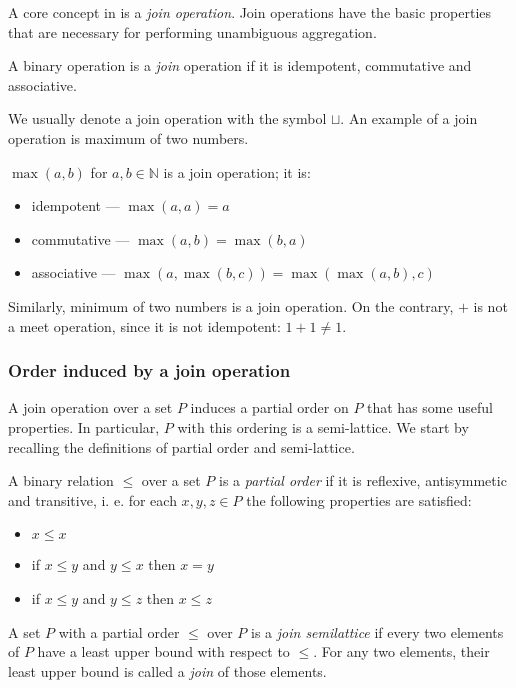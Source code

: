A core concept in \datalogra is a \emph{join operation}. Join operations have the basic properties that are necessary for performing unambiguous aggregation.

\begin{defn}
A binary operation is a \emph{join} operation if it is idempotent, commutative and associative. 
\end{defn}

We usually denote a join operation with the symbol $\sqcup$.
An example of a join operation is maximum of two numbers.

\begin{exmp}
$\max(a, b)$ for $a, b \in \mathbb{N}$ is a join operation; it is:
\begin{itemize}
\item idempotent --- $\max(a, a) = a$
\item commutative --- $\max(a, b) = \max(b, a)$
\item associative --- $\max(a, \max(b, c)) = \max(\max(a, b), c)$
\end{itemize}

Similarly, minimum of two numbers is a join operation. On the contrary, $+$ is not a meet operation, since it is not idempotent: $1+1 \ne 1$.
\end{exmp}

\subsubsection{Order induced by a join operation}

A join operation over a set $P$ induces a partial order on $P$ that has some useful properties. In particular, $P$ with this ordering is a semi-lattice. We start by recalling the definitions of partial order and semi-lattice.

\begin{defn}
A binary relation $\le$ over a set $P$ is a \emph{partial order} if it is reflexive, antisymmetic and transitive, i. e. for each $x, y, z \in P$ the following properties are satisfied:
\begin{itemize}
\item $x \le x$
\item if $x \le y$ and $y \le x$ then $x = y$
\item if $x \le y$ and $y \le z$ then $x \le z$
\end{itemize}
\end{defn}

\begin{defn}
A set $P$ with a partial order $\le$ over $P$ is a \emph{join semilattice} if every two elements of $P$ have a least upper bound with respect to $\le$. For any two elements, their least upper bound is called a \emph{join} of those elements.
\end{defn}

